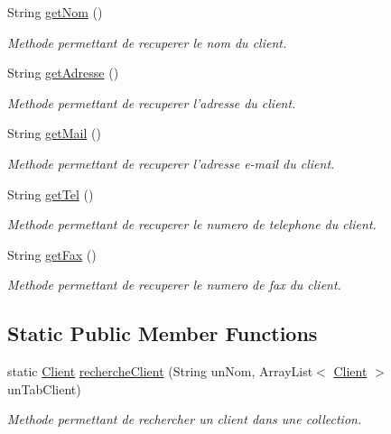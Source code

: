 \begin{DoxyCompactItemize}
String \hyperlink{classgestion_commande_1_1_client_a571b28e84f725329bb1f1d3eaee45559}{get\-Nom} ()
\begin{DoxyCompactList}\small\item\em Methode permettant de recuperer le nom du client. \end{DoxyCompactList}\item 
String \hyperlink{classgestion_commande_1_1_client_a3d39bb4646c3127d1e1442a1d5d509b7}{get\-Adresse} ()
\begin{DoxyCompactList}\small\item\em Methode permettant de recuperer l'adresse du client. \end{DoxyCompactList}\item 
String \hyperlink{classgestion_commande_1_1_client_aada1d9e19fbd79dd328aa974d1fb6a32}{get\-Mail} ()
\begin{DoxyCompactList}\small\item\em Methode permettant de recuperer l'adresse e-\/mail du client. \end{DoxyCompactList}\item 
String \hyperlink{classgestion_commande_1_1_client_ade639183bc4dcf084cdaa0b2cb5f7f78}{get\-Tel} ()
\begin{DoxyCompactList}\small\item\em Methode permettant de recuperer le numero de telephone du client. \end{DoxyCompactList}\item 
String \hyperlink{classgestion_commande_1_1_client_a63fd3f7825b06ebc2f80c281801da179}{get\-Fax} ()
\begin{DoxyCompactList}\small\item\em Methode permettant de recuperer le numero de fax du client. \end{DoxyCompactList}\end{DoxyCompactItemize}
\subsection*{Static Public Member Functions}
\begin{DoxyCompactItemize}
\item 
static \hyperlink{classgestion_commande_1_1_client}{Client} \hyperlink{classgestion_commande_1_1_client_a3c011b7f3d17b2dc4b391533ff9a28ce}{recherche\-Client} (String un\-Nom, Array\-List$<$ \hyperlink{classgestion_commande_1_1_client}{Client} $>$ un\-Tab\-Client)
\begin{DoxyCompactList}\small\item\em Methode permettant de rechercher un client dans une collection. \end{DoxyCompactList}\end{DoxyCompactItemize}


